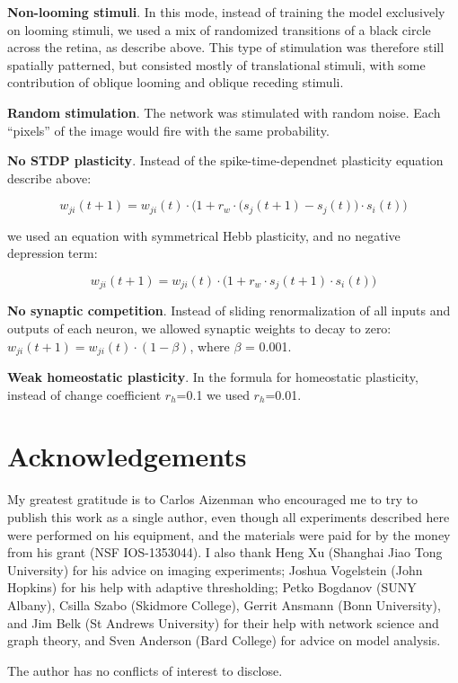 \documentclass{article}
\begin{document}
\textbf{Non-looming stimuli}. In this mode, instead of training the model exclusively on looming stimuli, we used a mix of randomized transitions of a black circle across the retina, as describe above. This type of stimulation was therefore still spatially patterned, but consisted mostly of translational stimuli, with some contribution of oblique looming and oblique receding stimuli.

\textbf{Random stimulation}. The network was stimulated with random noise. Each “pixels” of the image would fire with the same probability.

\textbf{No STDP plasticity}. Instead of the spike-time-dependnet plasticity equation describe above:

\[ w_{ji}(t+1) = w_{ji}(t)\cdot\Big(1+r_w \cdot \big(s_j(t+1)-s_j(t)\big)\cdot s_i(t)\Big) \]

we used an equation with symmetrical Hebb plasticity, and no negative depression term: 

\[ w_{ji}(t+1) = w_{ji}(t)\cdot\Big(1+r_w \cdot s_j(t+1) \cdot s_i(t)\Big) \]

\textbf{No synaptic competition}. Instead of sliding renormalization of all inputs and outputs of each neuron, we allowed synaptic weights to decay to zero: $w_{ji}(t+1) = w_{ji}(t)\cdot (1-\beta)$, where $\beta$ = 0.001.

\textbf{Weak homeostatic plasticity}. In the formula for homeostatic plasticity, instead of change coefficient $r_h$=0.1 we used $r_h$=0.01.

\section*{Acknowledgements}

My greatest gratitude is to Carlos Aizenman who encouraged me to try to publish this work as a single author, even though all experiments described here were performed on his equipment, and the materials were paid for by the money from his grant (NSF IOS-1353044). I also thank Heng Xu (Shanghai Jiao Tong University) for his advice on imaging experiments; Joshua Vogelstein (John Hopkins) for his help with adaptive thresholding; Petko Bogdanov (SUNY Albany), Csilla Szabo (Skidmore College), Gerrit Ansmann (Bonn University), and Jim Belk (St Andrews University) for their help with network science and graph theory, and Sven Anderson (Bard College) for advice on model analysis.


The author has no conflicts of interest to disclose.

\nolinenumbers


\end{document}
